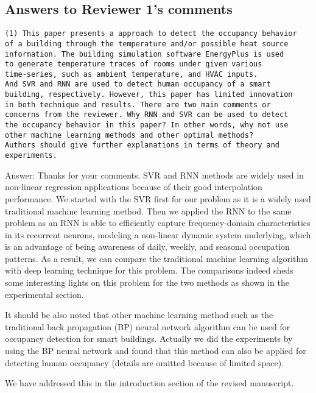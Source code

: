 \subsection{Answers to Reviewer 1's comments}
\begin{verbatim}
(1) This paper presents a approach to detect the occupancy behavior
of a building through the temperature and/or possible heat source
information. The building simulation software EnergyPlus is used
to generate temperature traces of rooms under given various
time-series, such as ambient temperature, and HVAC inputs.
And SVR and RNN are used to detect human occupancy of a smart
building, respectively. However, this paper has limited innovation
in both technique and results. There are two main comments or
concerns from the reviewer. Why RNN and SVR can be used to detect
the occupancy behavior in this paper? In other words, why not use
other machine learning methods and other optimal methods?
Authors should give further explanations in terms of theory and
experiments.
\end{verbatim}

Answer: Thanks for your comments. SVR and RNN methods are widely used
in non-linear regression applications because of their good
interpolation performance.  We started with the SVR first for our
problem as it is a widely used traditional machine learning
method. Then we applied the RNN to the same problem as an RNN is able
to efficiently capture frequency-domain characteristics in its
recurrent neurons, modeling a non-linear dynamic system underlying,
which is an advantage of being awareness of daily, weekly, and
seasonal occupation patterns.  As a result, we can compare the
traditional machine learning algorithm with deep learning technique
for this problem. The comparisons indeed sheds some interesting lights
on this problem for the two methods as shown in the experimental section.

It should be also noted that other machine learning method such as the
traditional back propagation (BP) neural network algorithm can be used
for occupancy detection for smart buildings. Actually we did the
experiments by using the BP neural network and found that this method
can also be applied for detecting human occupancy (details are omitted
because of limited space).

We have addressed this in the introduction section of the revised
manuscript.

